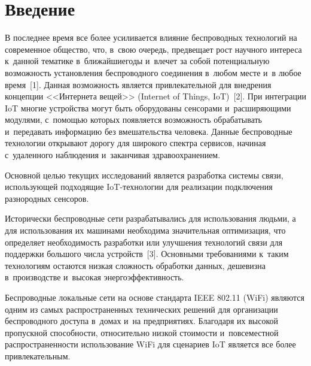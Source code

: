 
  



\thispagestyle{headings}

\begin{multicols}{2}

\label{st\stat}
    
  \section{Введение}
     
    В последнее время все более усиливается влияние беспроводных 
технологий на современное общество, что, в~свою очередь, предвещает 
рост научного интереса к~данной тематике в~ближайшие\linebreak годы и~влечет за 
собой потенциальную возможность установления беспроводного 
соединения в~любом месте и~в любое время~[1]. Данная возможность 
является привлекательной для внедрения концепции <<Интернета 
вещей>> (Internet of Things, IoT)~[2]. При интеграции IoT многие 
устройства могут быть оборудованы сенсорами и~расширяющими 
модулями, с~помощью которых появляется возможность обрабатывать 
и~передавать информацию без вмешательства человека. Данные 
беспроводные технологии открывают дорогу для широкого спектра 
сервисов, начиная с~удаленного наблюдения и~заканчивая 
здравоохранением. 

Основной целью текущих исследований является 
разработка системы связи, использующей подходящие  
IoT-тех\-но\-ло\-гии для реализации подключения разнородных сенсоров. 
{

}
    
    Исторически беспроводные сети разрабатывались для использования 
людьми, а для использования их машинами необходима значительная 
оптимизация, что определяет необходимость разработки или улучшения 
технологий связи для поддержки большого числа устройств~[3]. 
Основными требованиями к~таким технологиям остаются низкая 
сложность обработки данных, дешевизна в~производстве и~высокая 
энергоэффективность. 
    
    Беспроводные локальные сети на основе стандарта IEEE 802.11 
(WiFi) являются одним из самых распространенных технических 
решений для ор\-ганизации беспроводного доступа в~домах и~на 
предприятиях. Благодаря их высокой пропускной спо\-соб\-ности, 
относительно низкой сто\-и\-мости и~повсеместной распространенности 
использование WiFi для сценариев IoT является все более 
привлекательным. 


\end{multicols}
